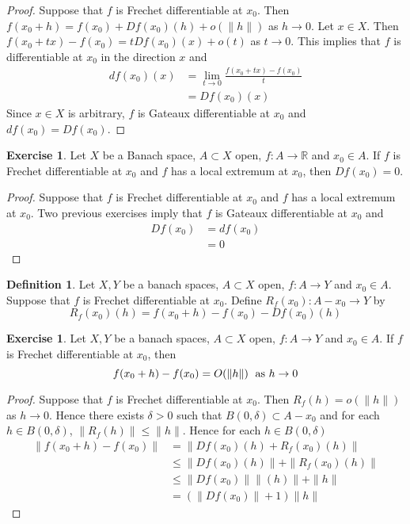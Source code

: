 \documentclass[12pt]{amsart}
\theoremstyle{definition}
\newtheorem{defn}[definition]{Definition}
\newtheorem{ex}[definition]{Exercise}
\newcommand{\del}{\delta}
\newcommand{\R}{\mathbb{R}}
\DeclareMathOperator*{\0}{\mbf{0}}
\DeclareMathOperator*{\1}{\mbf{1}}
\newcommand{\lex}[1]{\label{ex:#1}}
\newcommand{\ld}[1]{\label{defn:#1}}
\begin{document}
	\begin{proof}
	Suppose that $f$ is Frechet differentiable at $x_0$. Then $f(x_0 + h) = f(x_0) + Df(x_0)(h) + o(\|h\| )$ as $h \rightarrow 0$. Let $x \in X$. Then $f(x_0 + tx) - f(x_0) = tDf(x_0)(x) + o(t)$ as $t \rightarrow 0$. This implies that $f$ is differentiable at $x_0$ in the direction $x$ and 
	\begin{align*}
	df(x_0)(x) 
	&= \lim_{t \rightarrow 0} \frac{f(x_0 + tx) - f(x_0)}{t} \\
	&= Df(x_0)(x)
	\end{align*}
	Since $x \in X$ is arbitrary, $f$ is Gateaux differentiable at $x_0$ and $df(x_0) = Df(x_0)$.
	\end{proof}
	
	\begin{ex} \lex{62006}
	Let $X$ be a Banach space, $A \subset X$ open, $f:A \rightarrow \R$ and $x_0 \in A$. If $f$ is Frechet differentiable at $x_0$ and $f$ has a local extremum at $x_0$, then $Df(x_0) = 0$.
	\end{ex}	
	
	\begin{proof}
	Suppose that $f$ is Frechet differentiable at $x_0$ and $f$ has a local extremum at $x_0$. Two previous exercises imply that $f$ is Gateaux differentiable at $x_0$ and 
	\begin{align*}
	Df(x_0) 
	&= df(x_0) \\
	&= 0
	\end{align*}	
	\end{proof}
	
	\begin{defn} \ld{62007}
	Let $X, Y$ be a banach spaces, $A \subset X$ open, $f:A \rightarrow Y$ and $x_0 \in A$. Suppose that $f$ is Frechet differentiable at $x_0$. Define $R_f(x_0): A - x_0 \rightarrow Y$ by $$R_f(x_0)(h) = f(x_0 + h) - f(x_0) - Df(x_0)(h)$$
	\end{defn}
	
	\begin{ex} \lex{62008}
	Let $X, Y$ be a banach spaces, $A \subset X$ open, $f:A \rightarrow Y$ and $x_0 \in A$. If $f$ is Frechet differentiable at $x_0$, then $$f(x_0+h) - f(x_0) = O(\|h\|) \hspace{.1cm} \text{ as } h \rightarrow 0$$ 
	\end{ex}
	
	\begin{proof}
	Suppose that $f$ is Frechet differentiable at $x_0$. Then $R_f(h) = o(\|h\|)$ as $h \rightarrow 0$. Hence there exists $\del >0$ such that $B(0, \del) \subset A - x_0$ and for each $h \in B(0, \del)$, $\|R_f(h)\| \leq \|h\|$. Hence for each $h \in B(0, \del)$
	\begin{align*}
	\|f(x_0+h) - f(x_0) \| 
	&= \|Df(x_0)(h) + R_f(x_0)(h)\| \\
	& \leq \|Df(x_0)(h)\| + \|R_f(x_0)(h)\|  \\
	& \leq \|Df(x_0)\| \|(h)\| + \|h\| \\
	& = (\|Df(x_0)\| + 1) \|h\|
	\end{align*}
	\end{proof}
	
\end{document}
